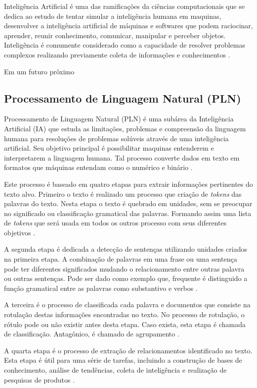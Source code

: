 Inteligência Artificial é uma das ramificações da ciências computacionais que se dedica ao estudo de tentar simular a inteligência humana em maquinas, desenvolver a inteligência artificial de máquinas e softwares que podem raciocinar, aprender, reunir conhecimento, comunicar, manipular e perceber objetos. Inteligência é comumente considerado como a capacidade de resolver problemas complexos realizando previamente coleta de informações e conhecimentos \cite{Pannu:2015}.

Em um futuro prôximo 
\subsection{Processamento de Linguagem Natural (PLN)} Processamento de Linguagem Natural (PLN) é uma subárea da Inteligência Artificial (IA) que estuda as limitações, problemas e compreensão da linguagem humana para resoluções de problemas solúveis através de uma inteligência artificial.  Seu objetivo principal é possibilitar maquinas entenderem e interpretarem a linguagem humana. Tal processo converte dados em texto em formatos que máquinas entendam como o numérico e binário \cite{Kulkarni:2019}.

Este processo é baseado em quatro etapas para extrair informações pertinentes do texto alvo. Primeiro o texto é realizado um processo que criação de \textit{tokens} das palavras do texto. Nesta etapa o texto é quebrado em unidades, sem se preocupar no significado ou classificação gramatical das palavras. Formando assim uma lista de \textit{tokens} que será usada em todos os outros processo com seus diferentes objetivos \cite{Reese:2015}.

A segunda etapa é dedicada a detecção de sentenças utilizando unidades criados na primeira etapa. A combinação de palavras em uma frase ou uma sentença pode ter diferentes significados mudando o relacionamento entre outras palavra ou outras sentenças. Pode ser dado como exemplo que, frequente é distinguido a função gramatical entre as palavras como substantivo e verbos \cite{Reese:2015}.

A terceira é o processo de classificada cada palavra e documentos que consiste na rotulação destas informações encontradas no texto. No processo de rotulação, o rótulo pode ou não existir antes desta etapa. Caso exista, esta etapa é chamada de classificação. Antagônico, é chamado de agrupamento \cite{Reese:2015}.

A quarta etapa é o processo de extração de relacionamentos identificado no texto. Esta etapa é útil para uma série de tarefas, incluindo a construção de bases de conhecimento, análise de tendências, coleta de inteligência e realização de pesquisas de produtos \cite{Reese:2015}.
